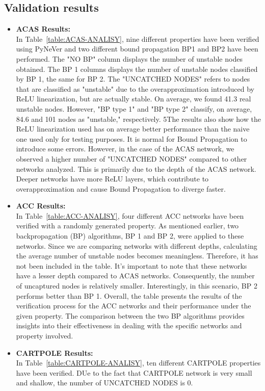 \subsection{Validation results}
\begin{itemize}
    \item \textbf{ACAS Results:}\\
    In Table~\ref{table:ACAS-ANALISY}, nine different properties have been verified using PyNeVer and two different bound propagation BP1 and BP2 have been performed. The "NO BP" column displays the number of unstable nodes obtained. 
    The BP 1 columns displays the number of unstable nodes classified by BP 1, the same for BP 2.
    The "UNCATCHED NODES" refers to nodes that are classified as "unstable" due to the overapproximation introduced by ReLU linearization, but are actually stable. On average, we found 41.3 real unstable nodes. 
    However, "BP type 1" and "BP type 2" classify, on average, 84.6 and 101 nodes as "unstable," respectively. 5The results also show how the ReLU linearization used has on average better performance than the naive one used only for testing purposes.
    It is normal for Bound Propagation to introduce some errors. However, in the case of the ACAS network, we observed a higher number of "UNCATCHED NODES" compared to other networks analyzed. This is primarily due to the depth of the ACAS network. Deeper networks have more ReLU layers, which contribute to overapproximation and cause Bound Propagation to diverge faster.
    \item \textbf{ACC Results:} \\
    In Table~\ref{table:ACC-ANALISY}, four different ACC networks have been verified with a randomly generated property. As mentioned earlier, two backpropagation (BP) algorithms, BP 1 and BP 2, were applied to these networks.
    Since we are comparing networks with different depths, calculating the average number of unstable nodes becomes meaningless. Therefore, it has not been included in the table.
    It's important to note that these networks have a lesser depth compared to ACAS networks. Consequently, the number of uncaptured nodes is relatively smaller. Interestingly, in this scenario, BP 2 performs better than BP 1.
    Overall, the table presents the results of the verification process for the ACC networks and their performance under the given property. The comparison between the two BP algorithms provides insights into their effectiveness in dealing with the specific networks and property involved.
    \item \textbf{CARTPOLE Results:}\\
    In Table~\ref{table:CARTPOLE-ANALISY}, ten different CARTPOLE properties have been verified. DUe to the fact that CARTPOLE network is very small and shallow, the number of UNCATCHED NODES is 0.  
\end{itemize}




